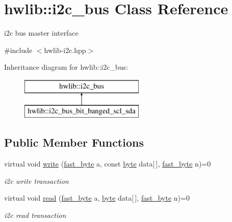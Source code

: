 \hypertarget{classhwlib_1_1i2c__bus}{}\section{hwlib\+:\+:i2c\+\_\+bus Class Reference}
\label{classhwlib_1_1i2c__bus}


i2c bus master interface  




{\ttfamily \#include $<$hwlib-\/i2c.\+hpp$>$}

Inheritance diagram for hwlib\+:\+:i2c\+\_\+bus\+:\begin{figure}[H]
\begin{center}
\leavevmode
\includegraphics[height=2.000000cm]{classhwlib_1_1i2c__bus}
\end{center}
\end{figure}
\subsection*{Public Member Functions}
\begin{DoxyCompactItemize}
\item 
virtual void \hyperlink{classhwlib_1_1i2c__bus_ab61d2f9d41ce7c019599fcbb87a420c0}{write} (\hyperlink{hwlib-defines_8hpp_a54998f25522db04b7b797b0fcc9eb3d5}{fast\+\_\+byte} a, const \hyperlink{hwlib-defines_8hpp_ab8ef12fab634c171394422d0ee8baf94}{byte} data\mbox{[}$\,$\mbox{]}, \hyperlink{hwlib-defines_8hpp_a54998f25522db04b7b797b0fcc9eb3d5}{fast\+\_\+byte} n)=0
\begin{DoxyCompactList}\small\item\em i2c write transaction \end{DoxyCompactList}\item 
virtual void \hyperlink{classhwlib_1_1i2c__bus_a389ef0c95c69657e1b36352f16d824d8}{read} (\hyperlink{hwlib-defines_8hpp_a54998f25522db04b7b797b0fcc9eb3d5}{fast\+\_\+byte} a, \hyperlink{hwlib-defines_8hpp_ab8ef12fab634c171394422d0ee8baf94}{byte} data\mbox{[}$\,$\mbox{]}, \hyperlink{hwlib-defines_8hpp_a54998f25522db04b7b797b0fcc9eb3d5}{fast\+\_\+byte} n)=0
\begin{DoxyCompactList}\small\item\em i2c read transaction \end{DoxyCompactList}\end{DoxyCompactItemize}


